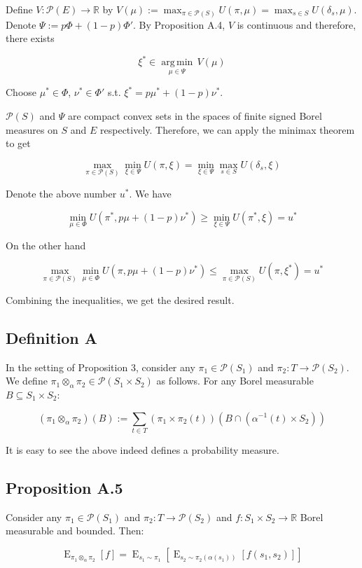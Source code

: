 \documentclass[a4paper]{article}
\DeclareMathOperator{\E}{E}
\newcommand{\Argmin}[1]{\underset{#1}{\operatorname{arg\,min}}\,}
\newcommand{\Reals}{\mathbb{R}}
\newcommand{\Prob}{\mathcal{P}}
\begin{document}
Define ${V: \Prob(E) \rightarrow \Reals}$ by ${V(\mu):=\max_{\pi \in \Prob(S)} U(\pi,\mu)=\max_{s \in S} U(\delta_s,\mu)}$. Denote ${\Psi:=p\Phi + (1-p)\Phi'}$. By Proposition A.4, ${V}$ is continuous and therefore, there exists

$$\xi^* \in \Argmin{\mu \in \Psi} V(\mu)$$

Choose ${\mu^* \in \Phi}$, ${\nu^* \in \Phi'}$ s.t. ${\xi^* = p \mu^* + (1-p) \nu^*}$.

${\Prob(S)}$ and ${\Psi}$ are compact convex sets in the spaces of finite signed Borel measures on ${S}$ and ${E}$ respectively. Therefore, we can apply the minimax theorem to get

$$\max_{\pi \in \Prob(S)} \min_{\xi \in \Psi} U(\pi,\xi) = \min_{\xi \in \Psi} \max_{s \in S} U(\delta_s,\xi)$$

Denote the above number ${u^*}$. We have

$$\min_{\mu \in \Phi} U(\pi^*,p\mu + (1-p)\nu^*) \geq \min_{\xi \in \Psi} U(\pi^*,\xi)=u^*$$

On the other hand

$$\max_{\pi \in \Prob(S)} \min_{\mu \in \Phi} U(\pi,p\mu + (1-p)\nu^*) \leq \max_{\pi \in \Prob(S)}  U(\pi,\xi^*)=u^*$$

Combining the inequalities, we get the desired result.

\subsection{Definition A}

In the setting of Proposition 3, consider any ${\pi_1 \in \Prob(S_1)}$ and ${\pi_2: T \rightarrow \Prob(S_2)}$. We define ${\pi_1 \otimes_\alpha \pi_2 \in \Prob(S_1 \times S_2)}$ as follows. For any Borel measurable ${B \subseteq S_1 \times S_2}$:

$$(\pi_1 \otimes_\alpha \pi_2)(B):=\sum_{t \in T} (\pi_1 \times \pi_2(t))(B \cap (\alpha^{-1}(t) \times S_2))$$ 

It is easy to see the above indeed defines a probability measure.

\subsection{Proposition A.5}

Consider any ${\pi_1 \in \Prob(S_1)}$ and ${\pi_2: T \rightarrow \Prob(S_2)}$ and ${f: S_1 \times S_2 \rightarrow \Reals}$ Borel measurable and bounded. Then:

$$\E_{\pi_1 \otimes_\alpha \pi_2}[f] = \E_{s_1 \sim \pi_1}[\E_{s_2 \sim \pi_2(\alpha(s_1))}[f(s_1, s_2)]]$$
\end{document}
